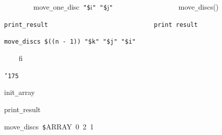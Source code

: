 \documentclass{article}
\begin{document}
\noindent
\mbox{}{\tt\mc \ \ \ \ \ \ \ \ }move{\tt\_}one{\tt\_}disc{\tt\mc \ }{\tt "}{\tt\$}i{\tt "}{\tt\mc \ }{\tt "}{\tt\$}j{\tt "}{\tt\mc \ \ \ \ \ \ \ \ \ \ \ \ \ \ \ \ \ }\rm\mc {\tt\#}\ move{\tt\_}discs()

\noindent
\mbox{}\tt\mc {\tt\mc \ \ \ \ \ \ \ \ }print{\tt\_}result{\tt\mc \ \ \ \ \ \ \ \ \ \ \ \ \ \ \ \ \ \ \ \ \ \ \ \ \ \ \ \ }\rm\mc {\tt\#}\ print\ result

\noindent
\mbox{}\tt\mc {\tt\mc \ \ \ \ \ \ \ \ }move{\tt\_}discs{\tt\mc \ }{\tt\$}((n{\tt\mc \ }{\tt -}{\tt\mc \ }1)){\tt\mc \ }{\tt "}{\tt\$}k{\tt "}{\tt\mc \ }{\tt "}{\tt\$}j{\tt "}{\tt\mc \ }{\tt "}{\tt\$}i{\tt "}

\noindent
\mbox{}{\tt\mc \ \ \ \ }fi

\noindent
\mbox{}{\tt\char'175}

\noindent
\mbox{}\hfill

\noindent
\mbox{}init{\tt\_}array

\noindent
\mbox{}print{\tt\_}result

\noindent
\mbox{}move{\tt\_}discs{\tt\mc \ }{\tt\$}ARRAY{\tt\mc \ }0{\tt\mc \ }2{\tt\mc \ }1

\noindent
\mbox{}

\rm\mc
\end{document}
